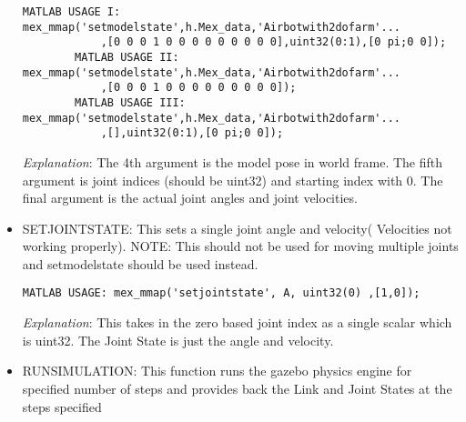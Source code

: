 \documentclass[letterpaper,10pt]{article}
\begin{document}
\begin{itemize}
\begin{Verbatim}[frame=single]
        MATLAB USAGE I: mex_mmap('setmodelstate',h.Mex_data,'Airbotwith2dofarm'...
			,[0 0 0 1 0 0 0 0 0 0 0 0 0],uint32(0:1),[0 pi;0 0]);
        MATLAB USAGE II: mex_mmap('setmodelstate',h.Mex_data,'Airbotwith2dofarm'...
			,[0 0 0 1 0 0 0 0 0 0 0 0 0]);
        MATLAB USAGE III: mex_mmap('setmodelstate',h.Mex_data,'Airbotwith2dofarm'...
			,[],uint32(0:1),[0 pi;0 0]);
\end{Verbatim}
        \textit{Explanation}: The 4th argument is the model pose in world frame. The fifth argument is joint indices (should be uint32) and starting index with 0. The final argument is the actual
        joint angles and joint velocities.
\item
  SETJOINTSTATE: This sets a single joint angle and velocity(%
  Velocities not working properly). NOTE: This should not be used for
  moving multiple joints and setmodelstate should be used instead.

\begin{Verbatim}[frame=single]
    MATLAB USAGE: mex_mmap('setjointstate', A, uint32(0) ,[1,0]);
\end{Verbatim}
    \textit{Explanation}: This takes in the zero based joint index as a single scalar which is uint32. The Joint State is just the angle and velocity. 
\item
  RUNSIMULATION: This function runs the gazebo physics engine for
  specified number of steps and provides back the Link and Joint States
  at the steps specified


\end{itemize}
\end{document}
